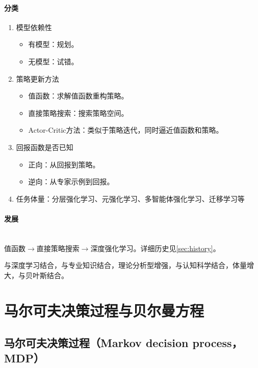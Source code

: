 \documentclass[
12pt, %
a4paper, 
oneside, %
headinclude,footinclude, %
]{scrartcl}
\begin{document}
\paragraph{分类}
\begin{enumerate}
\item 模型依赖性
\begin{itemize}
\item 有模型：规划。
\item 无模型：试错。
\end{itemize}
\item 策略更新方法
\begin{itemize}
\item 值函数：求解值函数重构策略。
\item 直接策略搜索：搜索策略空间。
\item Actor-Critic方法：类似于策略迭代，同时逼近值函数和策略。
\end{itemize}
\item 回报函数是否已知
\begin{itemize}
\item 正向：从回报到策略。
\item 逆向：从专家示例到回报。
\end{itemize}
\item 任务体量：分层强化学习、元强化学习、多智能体强化学习、迁移学习等
\end{enumerate}
\paragraph{发展}\label{sec:history back}~\\

值函数$ \rightarrow $直接策略搜索$ \rightarrow $深度强化学习。详细历史见\ref{sec:history}。

与深度学习结合，与专业知识结合，理论分析型增强，与认知科学结合，体量增大，与贝叶斯结合。
\section{马尔可夫决策过程与贝尔曼方程}
\subsection{马尔可夫决策过程（Markov decision process，MDP）}
\end{document}

